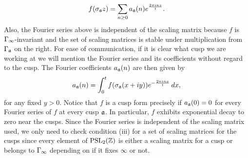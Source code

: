       \[
        f(\sigma_{\mathfrak{a}}z) = \sum_{n \ge 0}a_{\mathfrak{a}}(n)e^{\frac{2\pi inz}{t}}.
      \]
      Also, the Fourier series above is independent of the scaling matrix because $f$ is $\Gamma_{\infty}$-invariant and the set of scaling matrices is stable under multiplication from $\Gamma_{\mathfrak{a}}$ on the right. For ease of communication, if it is clear what cusp we are working at we will mention the Fourier series and its coefficients without regard to the cusp. The Fourier coefficients $a_{\mathfrak{a}}(n)$ are then given by
      \[
        a_{\mathfrak{a}}(n) = \int_{0}^{t}f(\sigma_{\mathfrak{a}}(x+iy))e^{-\frac{2\pi inx}{t}}\,dx,
      \]
      for any fixed $y > 0$. Notice that $f$ is a cusp form precisely if $a_{\mathfrak{a}}(0) = 0$ for every Fourier series of $f$ at every cusp $\mathfrak{a}$. In particular, $f$ exhibits exponential decay to zero near the cusps. Since the Fourier series is independent of the scaling matrix used, we only need to check condition (iii) for a set of scaling matrices for the cusps since every element of $\mathrm{PSL}_{2}(\mathbb{Z})$ is either a scaling matrix for a cusp or belongs to $\Gamma_{\infty}$ depending on if it fixes $\infty$ or not.
